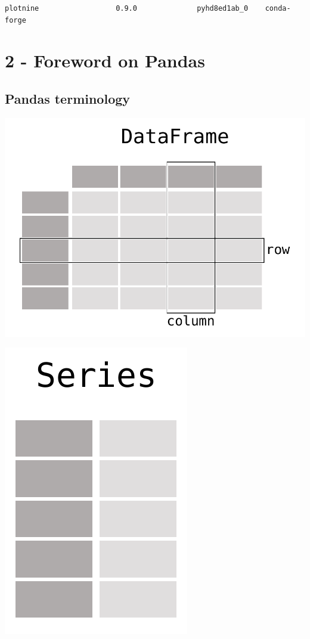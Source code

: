 \documentclass[
  letterpaper,
]{book}
\begin{document}
\begin{verbatim}
plotnine                  0.9.0              pyhd8ed1ab_0    conda-forge
\end{verbatim}

\hypertarget{foreword-on-pandas}{%
\section{2 - Foreword on Pandas}\label{foreword-on-pandas}}

\hypertarget{pandas-terminology}{%
\subsection{Pandas terminology}\label{pandas-terminology}}

\includegraphics{index_files/mediabag/assets/images/chapters/introduction-to-python/01_table_dataframe.pdf}

\includegraphics{index_files/mediabag/assets/images/chapters/introduction-to-python/01_table_series.pdf}
\end{document}
